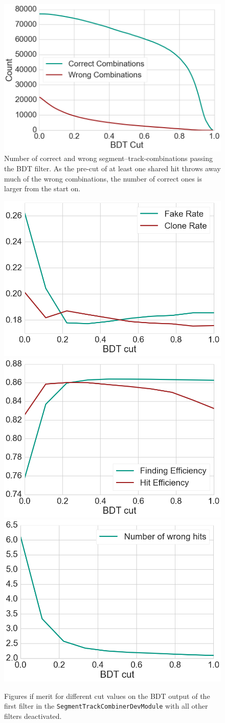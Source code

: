 \begin{figure}
  \centering
  \includegraphics[width=0.7\linewidth]{figures/workflow/first_filter_count.png}
  \caption{Number of correct and wrong segment--track-combinations passing the BDT filter. As the pre-cut of at least one shared hit throws away much of the wrong combinations, the number of correct ones is larger from the start on.}
  \label{fig-first-filter-count}
\end{figure}

\begin{figure}
  \centering
  \includegraphics[width=0.48\linewidth]{figures/workflow/first_filter_rate.png}
  \includegraphics[width=0.48\linewidth]{figures/workflow/first_filter_efficiency.png}
  \includegraphics[width=0.48\linewidth]{figures/workflow/first_filter_wrong_hits.png}
  \caption{Figures if merit for different cut values on the BDT output of the first filter in the \texttt{SegmentTrackCombinerDevModule} with all other filters deactivated.}
  \label{fig-first-filter-fom}
\end{figure}



